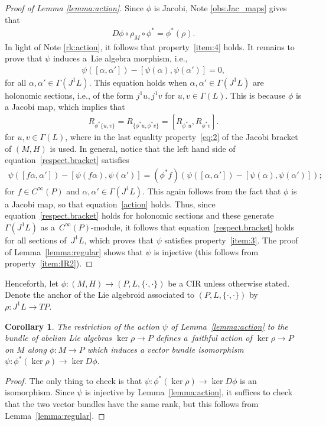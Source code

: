 \documentclass[10pt,a4paper]{amsart}
\numberwithin{equation}{section}
\newtheorem{Corollary}[Theorem]{Corollary}
\newcommand{\JM}{(P,L,\{\cdot,\cdot\})} %
\newcommand{\CM}{(M,H)} %
\begin{document}
\begin{proof}[Proof of Lemma \ref{lemma:action}] Since $\phi$ is Jacobi, Note \ref{obs:Jac_maps} gives that
 \begin{gather}\label{action}
 D\phi\circ\rho_M\circ\phi^*=\phi^*(\rho).
 \end{gather}
 In light of Note \ref{rk:action}, it follows that property~\ref{item:4} holds. It remains to prove that $\psi$ induces a~Lie
 algebra morphism, i.e.,
 \begin{gather}\label{respect.bracket}
 \psi([\alpha,\alpha'])-[\psi(\alpha),\psi(\alpha')]=0,
 \end{gather}
for all $\alpha,\alpha' \in \Gamma(J^1L)$. This equation holds when $\alpha,\alpha'\in\Gamma(J^1L)$ are holonomic sections, i.e., of the form $j^1u,j^1v$ for $u,v \in \Gamma(L)$. This is because $\phi$ is a Jacobi map, which implies that
 \begin{gather*}%
 R_{\phi^*\{u,v\}}=R_{\{\phi^*u,\phi^*v\}}=[R_{\phi^*u},R_{\phi^*v}].
 \end{gather*}
for $u,v\in \Gamma(L)$, where in the last equality property~\eqref{eq:2} of the Jacobi bracket of $\CM$ is used. In general, notice that the left hand side of equation~\eqref{respect.bracket} satisf\/ies
 \begin{gather*}
 \psi([f\alpha,\alpha'])-[\psi(f\alpha),\psi(\alpha')] = (\phi^*f)(\psi([\alpha,\alpha'])-[\psi(\alpha),\psi(\alpha')]);
 \end{gather*}
for $f \in C^{\infty}(P)$ and $\alpha,\alpha' \in \Gamma(J^1L)$. This again follows from the fact that $\phi$ is a Jacobi map, so that equation~\eqref{action} holds. Thus, since equation~\eqref{respect.bracket} holds for holonomic sections and these generate $\Gamma(J^1L)$ as a~$C^{\infty}(P)$-module, it follows that equation~\eqref{respect.bracket} holds for all sections of~$J^1L$, which proves that $\psi$ satisf\/ies property~\ref{item:3}. The proof of Lemma~\ref{lemma:regular} shows that $\psi$ is injective (this follows from property~\ref{item:IR2}).
\end{proof}

Henceforth, let $\phi \colon \CM \to \JM$ be a CIR unless otherwise stated. Denote the anchor of the Lie algebroid associated to $\JM$ by $\rho \colon J^1 L \to TP$.

\begin{Corollary}\label{obs:trans_inf_action}
The restriction of the action $\psi$ of Lemma~{\rm \ref{lemma:action}} to the bundle of abelian Lie algebras $\ker\rho \to P$ defines a~faithful action of $\ker \rho \to P$ on $M$ along $\phi \colon M \to P$ which induces a vector bundle isomorphism $\psi \colon \phi^*(\ker \rho) \to \ker D\phi$.
\end{Corollary}
\begin{proof} The only thing to check is that $\psi \colon \phi^*(\ker \rho) \to \ker D\phi$ is an isomorphism. Since $\psi$ is injective by Lemma~\ref{lemma:action}, it suf\/f\/ices to check that the two vector bundles have the same rank, but this follows from Lemma~\ref{lemma:regular}.
\end{proof}
\end{document}
